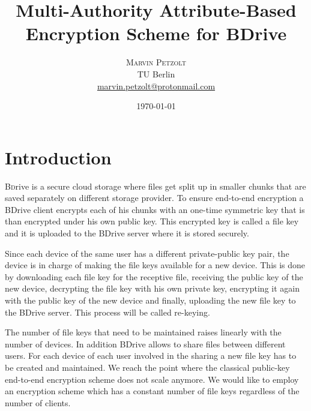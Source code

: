 \documentclass[twocolumn]{article}
\title{Multi-Authority Attribute-Based Encryption Scheme for BDrive } %
\author{%
\textsc{Marvin Petzolt}\\[1ex] %
\normalsize TU Berlin \\ %
\normalsize \href{mailto:marvin.petzolt@protonmail.com}{marvin.petzolt@protonmail.com} %
}
\date{\today} %
\begin{document}
\twocolumn[
    \maketitle
]



\section{Introduction}
\label{sec:introduction}

\lettrine[nindent=0em,lines=3]{B}
drive is a secure cloud storage where files get split up in smaller chunks that are saved separately on different storage provider. To ensure end-to-end encryption a BDrive client encrypts each of his chunks with an one-time symmetric key that is than encrypted under his own public key. This encrypted key is called a file key and it is uploaded to the BDrive server where it is stored securely. 

Since each device of the same user has a different private-public key pair, the device is in charge of making the file keys available for a new device. This is done by downloading each file key for the receptive file, receiving the public key of the new device, decrypting the file key with his own private key, encrypting it again with the public key of the new device and finally, uploading the new file key to the BDrive server. This process will be called re-keying. 

The number of file keys that need to be maintained raises linearly with the number of devices. In addition BDrive allows to share files between different users. For each device of each user involved in the sharing a new file key has to be created and maintained. We reach the point where the classical public-key end-to-end encryption scheme does not scale anymore. We would like to employ an encryption scheme which has a constant number of file keys regardless of the number of clients.


\end{document}
